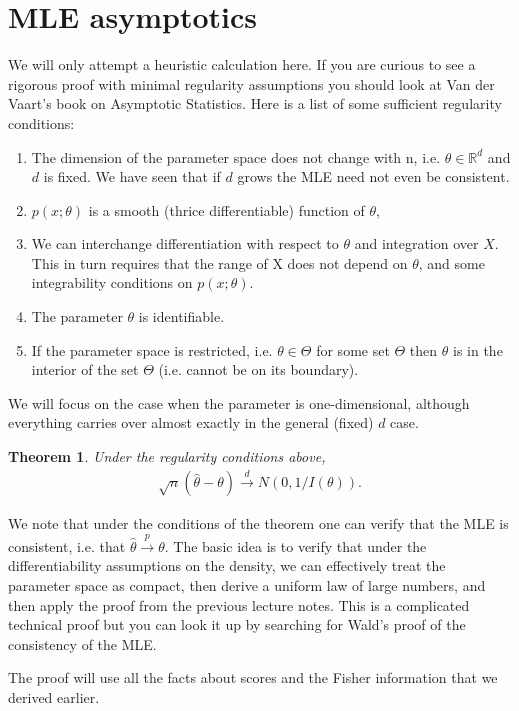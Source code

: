 \documentclass[twoside,12pt]{article}
\newcounter{lecnum}
\newtheorem{theorem}{Theorem}[lecnum]
\newcommand{\cdist}{\overset{d}{\rightarrow}}
\newcommand{\cprob}{\overset{p}{\rightarrow}}
\begin{document}
\section{MLE asymptotics}
We will only attempt a heuristic calculation here. If you are curious to see a rigorous proof with minimal regularity assumptions you should look at Van der Vaart's book on Asymptotic Statistics. 
Here is a list of some sufficient regularity conditions:
\begin{enumerate}
\item The dimension of the
parameter space does not change with n, i.e. $\theta \in \mathbb{R}^d$ and $d$ is fixed. We have seen that if $d$ grows the MLE need not even be consistent.
\item $p(x; \theta)$ is a smooth (thrice differentiable) function of $\theta$, 
\item We can
interchange differentiation with respect to $\theta$ and integration over $X$. This in turn requires that the range of X does not
depend on $\theta$, and some integrability conditions on $p(x;\theta)$. 
\item The parameter $\theta$ is identifiable.
\item If the parameter space is restricted, i.e. $\theta \in \Theta$ for some set $\Theta$ then $\theta$ is in the interior of the set $\Theta$ (i.e. cannot be on its boundary).
\end{enumerate}

We will focus on the case when the parameter is one-dimensional, although everything carries over almost exactly in the general (fixed) $d$ case.
\begin{theorem}
Under the regularity conditions above,
\begin{align*}
\sqrt{n} (\widehat{\theta} - \theta) \cdist N(0, 1/I(\theta)).
\end{align*}
\end{theorem}

We note that under the conditions of the theorem one can verify that the MLE is consistent, i.e. that $\widehat{\theta} \cprob \theta$. The basic idea is to verify that under the differentiability assumptions on the density, we can effectively treat the parameter space as compact, then derive a uniform law of large numbers, and then apply the proof from the previous lecture notes.  This is a complicated technical proof but you can look it up by searching for Wald's proof of the consistency of the MLE.

The proof will use all the facts about scores and the Fisher information that we derived earlier. 
\end{document}
